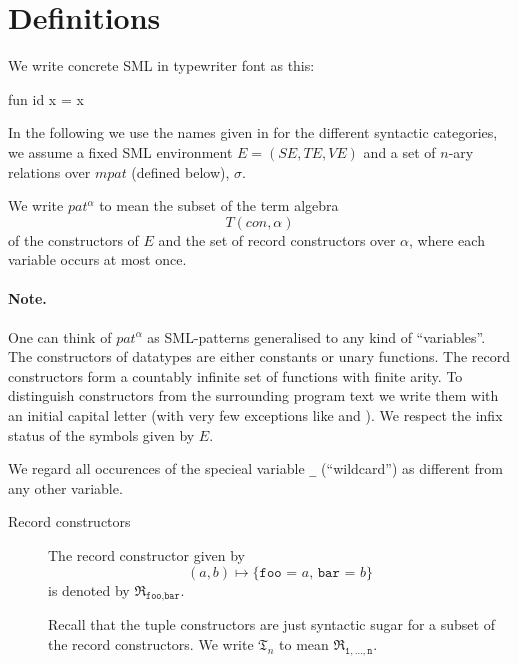 \section{Definitions}
We write concrete SML in typewriter font as this:
\begin{sml}
fun id x = x
\end{sml}

In the following we use the names given in \cite{SML97} for the different
syntactic categories, we assume a fixed SML environment $E = (S\!E, T\!E, V\!E)$
and a set of $n$-ary relations over $mpat$ (defined below), $\sigma$.

\begin{definition}
  We write $pat^\alpha$ to mean the subset of the term algebra
  \[
  T(con, \alpha)
  \]
  of the constructors of $E$ and the set of record constructors over $\alpha$,
  where each variable occurs at most once. 

\end{definition}

\paragraph{Note.} One can think of $pat^\alpha$ as SML-patterns generalised to
any kind of ``variables''. The constructors of datatypes are either constants or
unary functions. The record constructors form a countably infinite set of
functions with finite arity. To distinguish constructors from the surrounding
program text we write them with an initial capital letter (with very few
exceptions like \codeinline{::} and ). We respect the infix
status of the symbols given by $E$.

We regard all occurences of the specieal variable \texttt{\_} (``wildcard'') as
different from any other variable. 

\begin{description}
\item[Record constructors] The record constructor given by
  \[
  (a, b) \mapsto \texttt{\{foo = $a$, bar = $b$\}}
  \]
  is denoted by $\mathfrak{R}_{\texttt{foo},\texttt{bar}}$.

  Recall that the tuple constructors are just syntactic sugar for a subset of
  the record constructors. We write $\mathfrak{T}_n$ to mean
  $\mathfrak{R}_{\texttt{1},\ldots,\texttt{n}}$.
\end{description}

